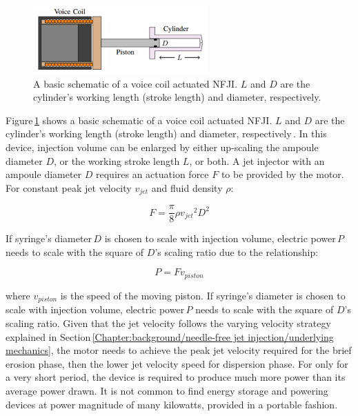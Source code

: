     
    \begin{figure}[!ht]
      \centering
      \includegraphics[width=0.6\textwidth]{chap2/images/vcm_for_nfji.png}
      \caption{A basic schematic of a voice coil actuated \acs{NFJI}. $L$ and $D$ are the cylinder’s working length (stroke length) and diameter, respectively.}
      \label{fig:chapter/background/vcm for nfji}
    \end{figure}
    
    
    Figure\,\ref{fig:chapter/background/vcm for nfji} shows a basic schematic of a voice coil actuated \acs{NFJI}. $L$ and $D$ are the cylinder’s working length (stroke length) and diameter, respectively\,\cite{ruddy2014}. In this device, injection volume can be enlarged by either up-scaling the ampoule diameter $D$, or the working stroke length $L$, or both. A jet injector with an ampoule diameter $D$ requires an actuation force $F$ to be provided by the motor. For constant peak jet velocity $v_{jet}$ and fluid density $\rho$:
    
    
    \begin{equation}
        F=\frac{\pi}{8}\rho {v_{jet}}^2 D^2
        \label{eq:force produce relationship in motor powered NFJI}
    \end{equation}
    
    
    If syringe’s diameter\,$D$ is chosen to scale with injection volume, electric power\,$P$ needs to scale with the square of $D$’s scaling ratio due to the relationship:
    
    
    \begin{equation}
        P=F v_{piston}
        \label{eq:power required for F and v_piston}
    \end{equation}
    
    
    where $v_{piston}$ is the speed of the moving piston. If syringe’s diameter  is chosen to scale with injection volume, electric power\,$P$ needs to scale with the square of $D$’s scaling ratio. Given that the jet velocity follows the varying velocity strategy explained in Section\,\ref{Chapter:background/needle-free jet injection/underlying mechanics}, the motor needs to achieve the peak jet velocity required for the brief erosion phase, then the lower jet velocity speed for dispersion phase. For only for a very short period, the device is required to produce much more power than its average power drawn. It is not common to find energy storage and powering devices at power magnitude of many kilowatts, provided in a portable fashion.
    
